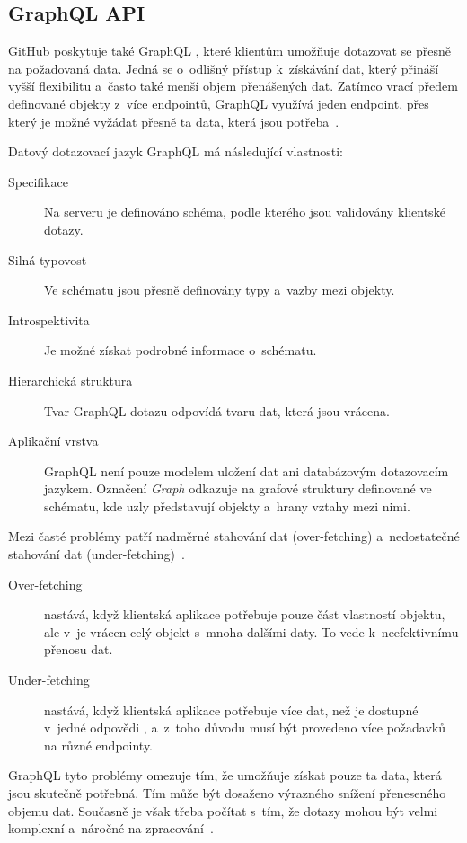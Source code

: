 \subsection{GraphQL API}
\label{subsec:github_api_graphql}
GitHub poskytuje také GraphQL \API, které klientům umožňuje dotazovat se přesně na požadovaná data. Jedná se o~odlišný přístup k~získávání dat, který přináší vyšší flexibilitu a~často také menší objem přenášených dat. Zatímco \REST \API vrací předem definované objekty z~více endpointů, GraphQL využívá jeden endpoint, přes který je možné vyžádat přesně ta data, která jsou potřeba~\cite{github_graphql_api,github_rest_api}.

Datový dotazovací jazyk GraphQL má následující vlastnosti:
\begin{description}
  \item[Specifikace] Na \API serveru je definováno schéma, podle kterého jsou validovány klientské dotazy.
  \item[Silná typovost] Ve schématu jsou přesně definovány typy a~vazby mezi objekty.
  \item[Introspektivita] Je možné získat podrobné informace o~schématu.
  \item[Hierarchická struktura] Tvar GraphQL dotazu odpovídá tvaru \JSON dat, která jsou vrácena.
  \item[Aplikační vrstva] GraphQL není pouze modelem uložení dat ani databázovým dotazovacím jazykem. Označení \textit{Graph} odkazuje na grafové struktury definované ve schématu, kde uzly představují objekty a~hrany vztahy mezi nimi.
\end{description}

Mezi časté problémy \REST \API patří nadměrné stahování dat (over-fetching) a~nedostatečné stahování dat (under-fetching)~\cite{github_graphql_api,github_rest_api}.

\begin{description}
  \item[Over-fetching] nastává, když klientská aplikace potřebuje pouze část vlastností objektu, ale v~\REST \API je vrácen celý objekt s~mnoha dalšími daty. To vede k~neefektivnímu přenosu dat.
  \item[Under-fetching] nastává, když klientská aplikace potřebuje více dat, než je dostupné v~jedné odpovědi \REST \API, a~z~toho důvodu musí být provedeno více požadavků na různé endpointy.
\end{description}

GraphQL \API tyto problémy omezuje tím, že umožňuje získat pouze ta data, která jsou skutečně potřebná. Tím může být dosaženo výrazného snížení přeneseného objemu dat. Současně je však třeba počítat s~tím, že dotazy mohou být velmi komplexní a~náročné na zpracování~\cite{github_graphql_api}.

